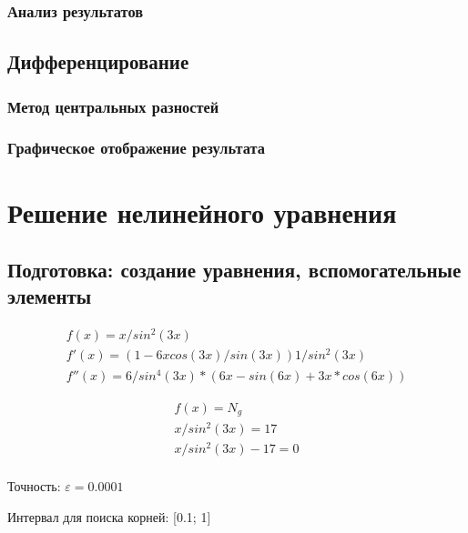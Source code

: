 \documentclass{article}
\begin{document}
\subsubsection{Анализ результатов}

\subsection{Дифференцирование}
\subsubsection{Метод центральных разностей}
\subsubsection{Графическое отображение результата}

\section{Решение нелинейного уравнения}
\subsection{Подготовка: создание уравнения, вспомогательные элементы}

\begin{displaymath}
  \begin{array}{ccc}
    f(x) = x / sin^2(3x)  \\
    f'(x) = (1 - 6x cos(3 x) / sin(3 x)) 1/sin^2(3 x)\\
    f''(x) = 6/sin^4(3x) * (6x - sin(6x) + 3x * cos(6x))
  \end{array}
\end{displaymath}

\begin{displaymath}
  \begin{array}{ccc}
    f(x) = N_{g}  \\
    x / sin^2(3x) = 17 \\
    x / sin^2(3x) - 17 = 0 \\
  \end{array}
\end{displaymath}

Точность: $\varepsilon = 0.0001$

Интервал для поиска корней: [0.1; 1]
\end{document}
